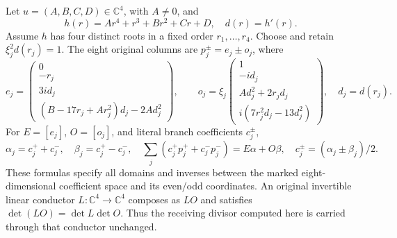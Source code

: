 \documentclass[11pt]{article}
\newcommand{\C}{\mathbb C}
\begin{document}
Let $u=(A,B,C,D)\in\C^4$, with $A\ne0$, and
\begin{equation}
 h(r)=Ar^4+r^3+Br^2+Cr+D,\quad d(r)=h'(r).
 \tag{OF1}
\end{equation}
Assume $h$ has four distinct roots in a fixed order $r_1,\ldots,r_4$.
Choose and retain $\xi_j^2d(r_j)=1$. The eight original columns are
$p_j^\pm=e_j\pm o_j$, where
\begin{equation}
 e_j=\begin{pmatrix}0\\-r_j\\3i d_j\\
 (B-17r_j+Ar_j^2)d_j-2Ad_j^2\end{pmatrix},\qquad
 o_j=\xi_j\begin{pmatrix}1\\-id_j\\Ad_j^2+2r_jd_j\\
 i(7r_j^2d_j-13d_j^2)\end{pmatrix},\quad d_j=d(r_j).
 \tag{OF2}
\end{equation}
For $E=[e_j]$, $O=[o_j]$, and literal branch coefficients $c_j^\pm$,
\begin{equation}
 \alpha_j=c_j^++c_j^-,\quad\beta_j=c_j^+-c_j^-,\quad
 \sum_j(c_j^+p_j^++c_j^-p_j^-)=E\alpha+O\beta,\quad
 c_j^\pm=(\alpha_j\pm\beta_j)/2.\tag{OF3}
\end{equation}
These formulas specify all domains and inverses between the marked
eight-dimensional coefficient space and its even/odd coordinates.
An original invertible linear conductor $L:\C^4\to\C^4$ composes
as $LO$ and satisfies $\det(LO)=\det L\det O$. Thus the receiving
divisor computed here is carried through that conductor unchanged.
\end{document}
